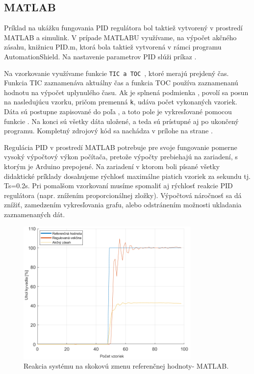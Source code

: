 
\subsection{MATLAB}
\label{MATLABPID}

Príklad na ukážku fungovania PID regulátora bol taktiež vytvorený v prostredí MATLAB a simulink. V prípade MATLABU využívame, na výpočet akčného zásahu, knižnicu PID.m, ktorá bola taktiež vytvorená v rámci programu AutomationShield. Na nastavenie parametrov PID slúži príkaz . 

Na vzorkovanie využívame funkcie \verb|TIC a TOC |, ktoré merajú prejdený čas. Funkcia TIC zaznamenáva aktuálny čas a funkcia TOC používa zaznamenanú hodnotu na výpočet uplynulého času. Ak je splnená podmienka , povolí sa posun na nasledujúcu vzorku, pričom premenná \verb*|k|, udáva počet vykonaných vzoriek. Dáta sú postupne zapisované do poľa , a toto pole je vykresľované pomocou funkcie . Na konci sú všetky dáta uložené, a teda sú prístupné aj po ukončený programu. Kompletný zdrojový kód sa nachádza v prílohe na strane \pageref{AeroShieldPID.m}.

Regulácia PID v prostredí MATLAB potrebuje pre svoje fungovanie pomerne vysoký výpočtový výkon počítača, pretože výpočty prebiehajú na zariadení, s ktorým je Arduino prepojené. Na zariadení\cite{Notebook} v ktorom boli písané všetky didaktické príklady dosahujeme rýchlosť maximálne piatich vzoriek za sekundu tj. Ts=0.2s. Pri pomalšom vzorkovaní musíme spomaliť aj rýchlosť reakcie PID regulátora (napr. znížením proporcionálnej zložky). Výpočtová náročnosť sa dá znížiť, zamedzením vykresľovania grafu, alebo odstránením možnosti ukladania zaznamenaných dát. 

\begin{figure}[!tbh]
	\centering
	\includegraphics[width=90mm]{obr/jednotkovyskoskMAt.png}
	\caption{Reakcia systému na skokovú zmenu referenčnej hodnoty- MATLAB.}\label{OBRAZOK 2.6.1}
\end{figure}

